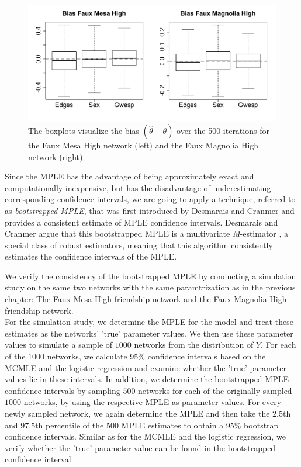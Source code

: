 \documentclass[headsepline=true, abstracton]{scrartcl}
\begin{document}
\begin{figure}[H]
\begin{center}
\includegraphics[scale=.40]{bias_plots_05}
\caption{The boxplots visualize the bias $(\hat{\theta}-\theta)$ over the 500 iterations for the Faux Mesa High network (left) and the Faux Magnolia High network (right).}
\label{bias}
\end{center}
\end{figure}
\noindent Since the MPLE has the advantage of being approximately exact and computationally inexpensive, but has the disadvantage of underestimating corresponding confidence intervals, we are going to apply a technique, referred to as \textit{bootstrapped MPLE}, that was first introduced by Desmarais and Cranmer \cite{Desmarais.2012} and provides a consistent estimate of MPLE confidence intervals. Desmarais and Cranmer argue that this bootstrapped MPLE is a multivariate \textit{M}-estimator \cite{Huber1981}, a special class of robust estimators, meaning that this algorithm consistently estimates the confidence intervals of the MPLE.



\noindent We verify the consistency of the bootstrapped MPLE by conducting a simulation study on the same two networks with the same paramtrization as in the previous chapter: The Faux Mesa High friendship network and the Faux Magnolia High friendship network. \\[0.3cm]
For the simulation study, we determine the MPLE for the model and treat these estimates as the networks' 'true' parameter values. We then use these parameter values to simulate a sample of $1000$ networks from the distribution of $Y$. For each of the $1000$ networks, we calculate 95\% confidence intervals based on the MCMLE and the logistic regression and examine whether the 'true' parameter values lie in these intervals. In addition, we determine the bootstrapped MPLE confidence intervals by sampling $500$ networks for each of the originally sampled $1000$ networks, by using the respective MPLE as parameter values. For every newly sampled network, we again determine the MPLE and then take the $2.5$th and $97.5$th percentile of the $500$ MPLE estimates to obtain a 95\% bootstrap confidence intervals. Similar as for the MCMLE and the logistic regression, we verify whether the 'true' parameter value can be found in the bootstrapped confidence interval. 
\end{document}
